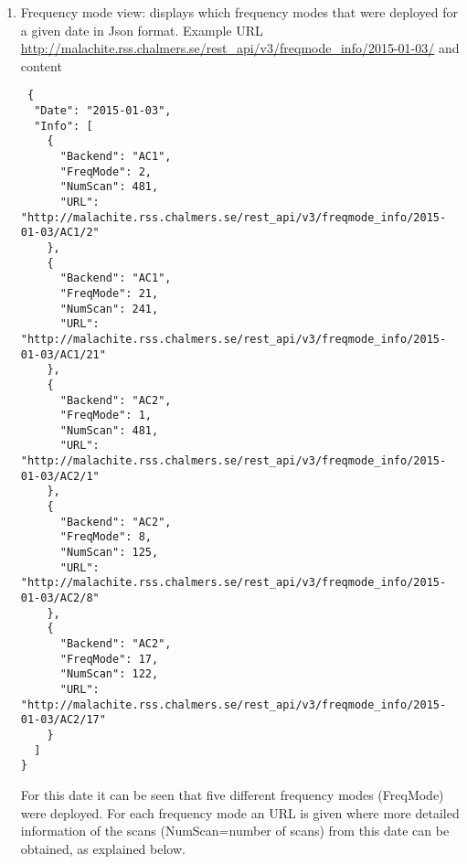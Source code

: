 \begin{enumerate}

\item Frequency mode view: displays which frequency modes that were deployed for a
 given date in Json format. Example URL
 \url{http://malachite.rss.chalmers.se/rest_api/v3/freqmode_info/2015-01-03/} and content
 \begin{tiny}
 \begin{verbatim}
 {
  "Date": "2015-01-03", 
  "Info": [
    {
      "Backend": "AC1", 
      "FreqMode": 2, 
      "NumScan": 481, 
      "URL": "http://malachite.rss.chalmers.se/rest_api/v3/freqmode_info/2015-01-03/AC1/2"
    }, 
    {
      "Backend": "AC1", 
      "FreqMode": 21, 
      "NumScan": 241, 
      "URL": "http://malachite.rss.chalmers.se/rest_api/v3/freqmode_info/2015-01-03/AC1/21"
    }, 
    {
      "Backend": "AC2", 
      "FreqMode": 1, 
      "NumScan": 481, 
      "URL": "http://malachite.rss.chalmers.se/rest_api/v3/freqmode_info/2015-01-03/AC2/1"
    }, 
    {
      "Backend": "AC2", 
      "FreqMode": 8, 
      "NumScan": 125, 
      "URL": "http://malachite.rss.chalmers.se/rest_api/v3/freqmode_info/2015-01-03/AC2/8"
    }, 
    {
      "Backend": "AC2", 
      "FreqMode": 17, 
      "NumScan": 122, 
      "URL": "http://malachite.rss.chalmers.se/rest_api/v3/freqmode_info/2015-01-03/AC2/17"
    }
  ]
}
 \end{verbatim}
\end{tiny}
For this date it can be seen that five different frequency modes (FreqMode) were deployed.
For each frequency mode an URL is given where more detailed information of
the scans (NumScan=number of scans) from this date can be obtained, as explained below.
 


\end{enumerate}
